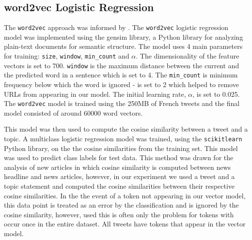 \documentclass[journal]{IEEEtran}
\newcommand{\code}[1]{\texttt{#1}}
\begin{document}
\subsection{word2vec Logistic Regression}
The \code{word2vec} \cite{DBLP:journals/corr/abs-1301-3781} approach was informed by \cite{MOHAMMAD16.232,DBLP:conf/starsem/SobhaniMK16}.
The \code{word2vec} logistic regression model was implemented using the gensim \cite{rehurek_lrec} library, a Python library for analyzing plain-text documents for semantic structure. The model uses 4 main parameters for training: \code{size}, \code{window}, \code{min\_count} and $\alpha$. The dimensionality of the feature vectors is set to 700. \code{window} is the maximum distance between the current and the predicted word in a sentence which is set to 4. The \code{min\_count} is minimum frequency below which the word is ignored - is set to 2 which helped to remove URLs from appearing in our model. The initial learning rate, $\alpha$, is set to 0.025. The \code{word2vec} model is trained using the 250MB of French tweets and the final model consisted of around 60000 word vectors.

This model was then used to compute the cosine similarity between a tweet and a topic. A multiclass logistic regression model was trained, using the \code{scikitlearn} \cite{scikit-learn} Python library, on the the cosine similarities from the training set. This model was used to predict class labels for test data. This method was drawn for the analysis of new articles in which cosine similarity is computed between news headline and news articles, however, in our experiment we used a tweet and a topic statement and computed the cosine similarities between their respective cosine similarities. In the the event of a token not appearing in our vector model, this data point is treated as an error by the classification and is ignored by the cosine similarity, however, used this is often only the problem for tokens with occur once in the entire dataset. All tweets have tokens that appear in the vector model. 
\end{document}
